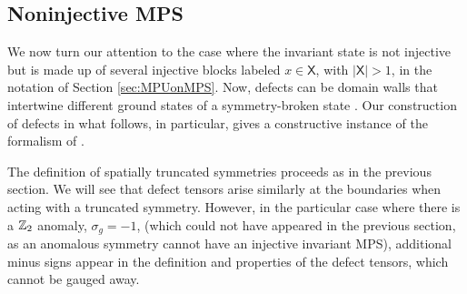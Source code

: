 \documentclass[reprint,
superscriptaddress,
amsmath,amssymb,
notitlepage,
aps,
prb,
10pt, 
tightenlines
]{revtex4-2}
\begin{document}
\subsection{Noninjective MPS}
\label{sec:noninj}
We now turn our attention to the case where the invariant state is not injective but is made up of several injective blocks labeled $x\in \mathsf{X}$, with $|\mathsf{X}|>1$, in the notation of Section \ref{sec:MPUonMPS}. Now, defects can be domain walls that intertwine different ground states of a symmetry-broken state \cite{PhysRevB.85.100408}. Our construction of defects in what follows, in particular, gives a constructive instance of the formalism of \cite{GarreSchuch}.

The definition of spatially truncated symmetries proceeds as in the previous section. We will see that defect tensors arise similarly at the boundaries when acting with a truncated symmetry. However, in the particular case where there is a $\mathbb{Z}_2$ anomaly, $\sigma_g=-1$, (which could not have appeared in the previous section, as an anomalous symmetry cannot have an injective invariant MPS), additional minus signs appear in the definition and properties of the defect tensors, which cannot be gauged away.
\end{document}
